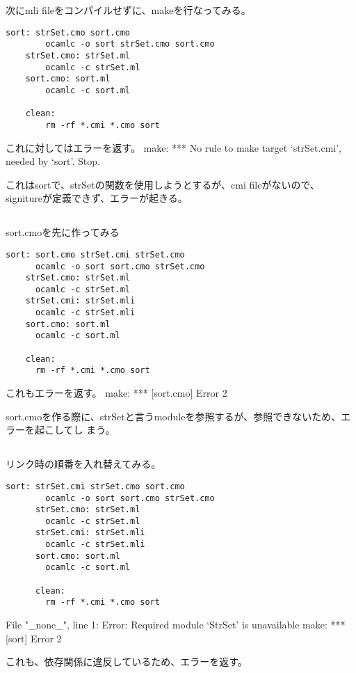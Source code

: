 \documentclass[uplatex,12pt]{jsarticle}
\begin{document}
次にmli fileをコンパイルせずに、makeを行なってみる。
  \begin{lstlisting}[caption=make fileの中身]
    sort: strSet.cmo sort.cmo
        ocamlc -o sort strSet.cmo sort.cmo
    strSet.cmo: strSet.ml
        ocamlc -c strSet.ml
    sort.cmo: sort.ml
        ocamlc -c sort.ml

    clean:
        rm -rf *.cmi *.cmo sort
  \end{lstlisting}

これに対してはエラーを返す。
make: *** No rule to make target `strSet.cmi', needed by `sort'.  Stop.

これはsortで、strSetの関数を使用しようとするが、cmi fileがないので、signitureが定義できず、エラーが起きる。

\subsection{}
sort.cmoを先に作ってみる
  \begin{lstlisting}[caption=make fileの中身]
    sort: sort.cmo strSet.cmi strSet.cmo
      ocamlc -o sort sort.cmo strSet.cmo
    strSet.cmo: strSet.ml
      ocamlc -c strSet.ml
    strSet.cmi: strSet.mli
      ocamlc -c strSet.mli
    sort.cmo: sort.ml
      ocamlc -c sort.ml

    clean:
      rm -rf *.cmi *.cmo sort
  \end{lstlisting}

これもエラーを返す。
make: *** [sort.cmo] Error 2

sort.cmoを作る際に、strSetと言うmoduleを参照するが、参照できないため、エラーを起こしてし
まう。

\subsection{}
リンク時の順番を入れ替えてみる。
  \begin{lstlisting}[caption=make fileの中身]
      sort: strSet.cmi strSet.cmo sort.cmo
        ocamlc -o sort sort.cmo strSet.cmo
      strSet.cmo: strSet.ml
        ocamlc -c strSet.ml
      strSet.cmi: strSet.mli
        ocamlc -c strSet.mli
      sort.cmo: sort.ml
        ocamlc -c sort.ml

      clean:
        rm -rf *.cmi *.cmo sort
  \end{lstlisting}

  File "\_none\_", line 1:
  Error: Required module `StrSet' is unavailable
  make: *** [sort] Error 2

  これも、依存関係に違反しているため、エラーを返す。
\end{document}
